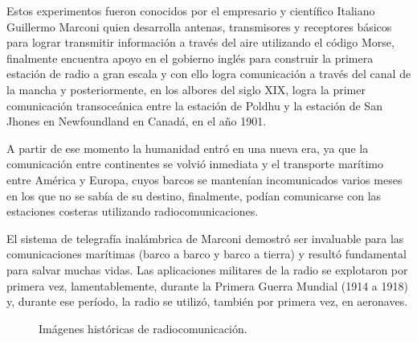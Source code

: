 Estos experimentos fueron conocidos por el empresario y científico Italiano Guillermo Marconi quien desarrolla antenas, transmisores y receptores básicos para lograr transmitir información a través del aire utilizando el código Morse, finalmente encuentra apoyo en el gobierno inglés para construir la primera estación de radio a gran escala y con ello logra comunicación a través del canal de la mancha y posteriormente, en los albores del siglo XIX, logra la primer comunicación transoceánica entre la estación de Poldhu y la estación de San Jhones en Newfoundland en Canadá, en el año 1901.

A partir de ese momento la humanidad entró en una nueva era, ya que la comunicación entre continentes se volvió inmediata y el transporte marítimo entre América y Europa, cuyos barcos se mantenían incomunicados varios meses en los que no se sabía de su destino, finalmente, podían comunicarse con las estaciones costeras utilizando radiocomunicaciones.

El sistema de telegrafía inalámbrica de Marconi demostró ser invaluable para las comunicaciones mar\'itimas (barco a barco y barco a tierra) y result\'o fundamental para salvar muchas vidas. Las aplicaciones militares de la radio se explotaron por primera vez, lamentablemente, durante la Primera Guerra Mundial (1914 a 1918) y, durante ese período, la radio se utilizó, tambi\'en por primera vez, en aeronaves.

\begin{figure}[!htb]
  \centering
   \hspace{3mm}

  \caption{Im\'agenes hist\'oricas de radiocomunicaci\'on. %
}
  \label{fig:A.imagenes.historicas.radiocomunicacion}
\end{figure}





